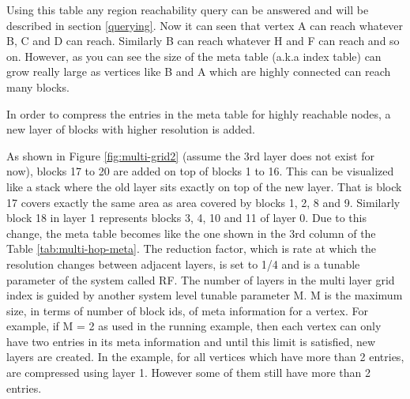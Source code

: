Using this table any region reachability query can be answered and will be described in section \ref{querying}. Now it can seen that vertex A can reach whatever B, C and D can reach. Similarly B can reach whatever H and F can reach and so on. However, as you can see the size of the meta table (a.k.a index table) can grow really large as vertices like B and A which are highly connected can reach many blocks.

In order to compress the entries in the meta table for highly reachable nodes, a new layer of blocks with higher resolution is added.


As shown in Figure \ref{fig:multi-grid2} (assume the 3rd layer does not exist for now), blocks 17 to 20 are added on top of blocks 1 to 16. This can be visualized like a stack where the old layer sits exactly on top of the new layer. That is block 17 covers exactly the same area as area covered by blocks 1, 2, 8 and 9. Similarly block 18 in layer 1 represents blocks 3, 4, 10 and 11 of layer 0. Due to this change, the meta table becomes like the one shown in the 3rd column of the Table \ref{tab:multi-hop-meta}. The reduction factor, which is rate at which the resolution changes between adjacent layers, is set to 1/4 and is a tunable parameter of the system called RF. The number of layers in the multi layer grid index is guided by another system level tunable parameter M. M is the maximum size, in terms of number of block ids, of meta information for a vertex. For example, if M = 2 as used in the running example, then each vertex can only have two entries in its meta information and until this limit is satisfied, new layers are created. In the example, for all vertices which have more than 2 entries, are compressed using layer 1. However some of them still have more than 2 entries. 



